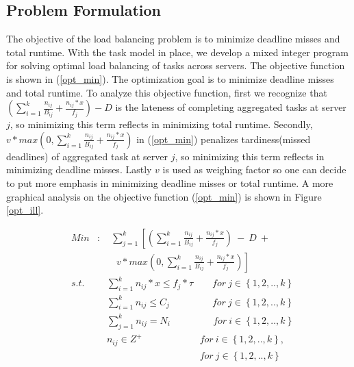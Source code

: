 \subsection{Problem Formulation}










The objective of the load balancing problem is to minimize deadline misses and total runtime. With the task model in place, we develop a mixed integer program for solving optimal load balancing of tasks across servers. The objective function is shown in (\ref{opt_min}). The optimization goal is to minimize deadline misses and total runtime. To analyze this objective function, first we recognize that $\left (\sum\limits_{i=1}^{k} \frac{n_{ij}}{B_{ij}}+\frac{n_{ij}*x}{f_{j}}\right )-D$ is the lateness of completing aggregated tasks at server $j$, so minimizing this term reflects in minimizing total runtime. Secondly, $v*max\left ( 0, \sum\limits_{i=1}^{k} \frac{n_{ij}}{B_{ij}}+\frac{n_{ij}*x}{f_{j}}\right )$ in (\ref{opt_min}) penalizes tardiness(missed deadlines) of aggregated task at server $j$, so minimizing this term reflects in minimizing deadline misses. Lastly $v$ is used as weighing factor so one can decide to put more emphasis in minimizing deadline misses or total runtime. A more graphical analysis on the objective function (\ref{opt_min}) is shown in Figure \ref{opt_ill}.



\setlength{\arraycolsep}{0.0em}
\small
\begin{eqnarray}
\label{opt_min}
&Min&: \quad \sum_{j=1}^{k}\left [\left (\sum\limits_{i=1}^{k} \frac{n_{ij}}{B_{ij}}+\frac{n_{ij}*x}{f_{j}} \right ) \ - \ D \ + \right.\nonumber\\
&\phantom{min}&\qquad \left.v * max\left ( 0, \sum\limits_{i=1}^{k} \frac{n_{ij}}{B_{ij}}+\frac{n_{ij}*x}{f_{j}}\right )\right ]\\
\label{opt_concpu}
&s.t.& \quad\sum_{i=1}^{k} n_{ij}*x\leq f_{j}*\tau  \qquad for \ j\in \left \{ 1,2,..,k \right \}\\
\label{opt_conc}
&\phantom{s.t.}& \quad\sum_{i=1}^{k} n_{ij}\leq C_{j} \ \ \qquad\quad\quad for \ j\in \left \{ 1,2,..,k \right \}\\
\label{opt_n}
&\phantom{s.t.}& \quad\sum_{j=1}^{k} n_{ij}=N_{i} \  \ \qquad \quad \quad for \ i\in \left \{ 1,2,..,k \right \} \\
\label{opt_int}
&\phantom{s.t.}& \quad n_{ij}\in Z^{+} \qquad \qquad \qquad  for \ i\in \left \{ 1,2,..,k \right \} ,\nonumber\\
&\phantom{s.t.}& \quad\phantom{n_{ij}\in Z^{+}}  \qquad \qquad \qquad for \ j\in \left \{ 1,2,..,k \right \}
\end{eqnarray}
\setlength{\arraycolsep}{5pt}

